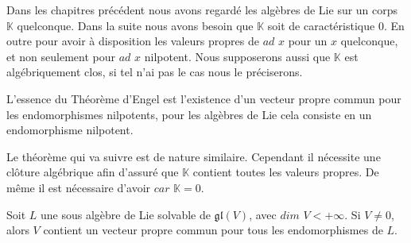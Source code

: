 \documentclass[a4paper,openany,12pt]{report}
\newcommand{\KK}{\mathbb{K}}
\newcommand{\gl}{\mathfrak{gl}}
\theoremstyle{break}
{\theorembodyfont{\upshape}
\newtheorem*{rmq}{Remarque :}
\newtheorem*{prv}{Preuve :}
\newtheorem*{ex}{Exemples :}
\newtheorem{exe}{Exemple : }
\newtheorem*{nota}{Notation :}}
\begin{document}
\quad Dans les chapitres précédent nous avons regardé les algèbres de Lie sur un corps $\KK$ quelconque. Dans la suite nous avons besoin que $\KK$ soit de caractéristique $0$. En outre pour avoir à disposition les valeurs propres de $ad$ $x$ pour un $x$ quelconque, et non seulement pour $ad$ $x$ nilpotent. Nous supposerons aussi que $\KK$ est algébriquement clos, si tel n'ai pas le cas nous le préciserons.

\quad L'essence du Théorème d'Engel est l’existence d'un vecteur propre commun pour les endomorphismes nilpotents, pour les algèbres de Lie cela consiste en un endomorphisme nilpotent.

\quad Le théorème qui va suivre est de nature similaire. Cependant il nécessite une clôture algébrique afin d'assuré que $\KK$ contient toutes les valeurs propres. De même il est nécessaire d'avoir $car$ $\KK =0$.

\begin{thm}\label{thm:L1}
\quad Soit $L$ une sous algèbre de Lie solvable de $\gl(V)$, avec $dim$ $V < +\infty$. Si $V \neq 0$, alors $V$ contient un vecteur propre commun pour tous les endomorphismes de $L$.
\end{thm}
\end{document}
